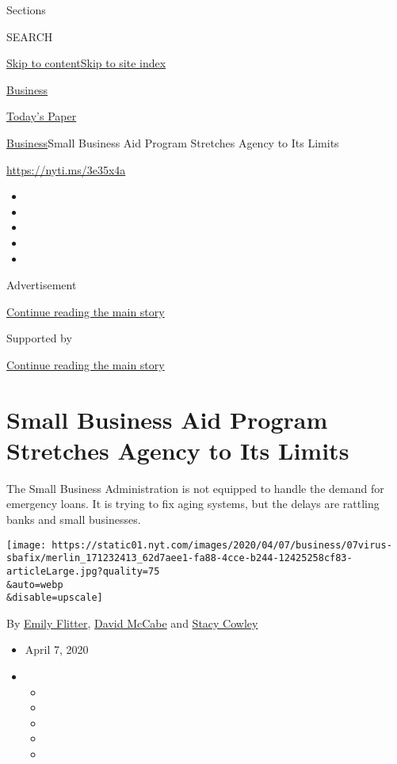 Sections

SEARCH

\protect\hyperlink{site-content}{Skip to
content}\protect\hyperlink{site-index}{Skip to site index}

\href{https://www.nytimes.com/section/business}{Business}

\href{https://myaccount.nytimes.com/auth/login?response_type=cookie\&client_id=vi}{}

\href{https://www.nytimes.com/section/todayspaper}{Today's Paper}

\href{/section/business}{Business}\textbar{}Small Business Aid Program
Stretches Agency to Its Limits

\url{https://nyti.ms/3e35x4a}

\begin{itemize}
\item
\item
\item
\item
\item
\end{itemize}

Advertisement

\protect\hyperlink{after-top}{Continue reading the main story}

Supported by

\protect\hyperlink{after-sponsor}{Continue reading the main story}

\hypertarget{small-business-aid-program-stretches-agency-to-its-limits}{%
\section{Small Business Aid Program Stretches Agency to Its
Limits}\label{small-business-aid-program-stretches-agency-to-its-limits}}

The Small Business Administration is not equipped to handle the demand
for emergency loans. It is trying to fix aging systems, but the delays
are rattling banks and small businesses.

\texttt{[image: https://static01.nyt.com/images/2020/04/07/business/07virus-sbafix/merlin\_171232413\_62d7aee1-fa88-4cce-b244-12425258cf83-articleLarge.jpg?quality=75\\\&auto=webp\\\&disable=upscale]}

By \href{https://www.nytimes.com/by/emily-flitter}{Emily Flitter},
\href{https://www.nytimes.com/by/david-mccabe}{David McCabe} and
\href{https://www.nytimes.com/by/stacy-cowley}{Stacy Cowley}

\begin{itemize}
\item
  April 7, 2020
\item
  \begin{itemize}
  \item
  \item
  \item
  \item
  \item
  \end{itemize}
\end{itemize}

